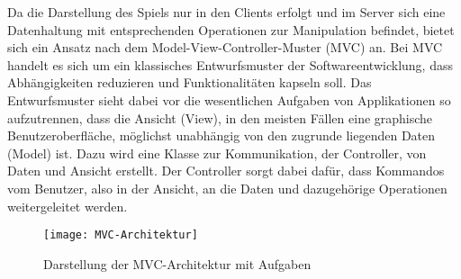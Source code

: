\noindent Da die Darstellung des Spiels nur in den Clients erfolgt und im Server sich eine Datenhaltung mit entsprechenden Operationen zur Manipulation befindet, bietet sich ein Ansatz nach dem Model-View-Controller-Muster (MVC) an. Bei MVC handelt es sich um ein klassisches Entwurfsmuster der Softwareentwicklung, dass Abhängigkeiten reduzieren und Funktionalitäten kapseln soll. Das Entwurfsmuster sieht dabei vor die wesentlichen Aufgaben von Applikationen so aufzutrennen, dass die Ansicht (View), in den meisten Fällen eine graphische Benutzeroberfläche, möglichst unabhängig von den zugrunde liegenden Daten (Model) ist. Dazu wird eine Klasse zur Kommunikation, der Controller, von Daten und Ansicht erstellt. Der Controller sorgt dabei dafür, dass Kommandos vom Benutzer, also in der Ansicht, an die Daten und dazugehörige Operationen weitergeleitet werden.

\begin{figure}[h]
	\centering
	\captionsetup{justification=centering}
	\texttt{[image: MVC-Architektur]}
	\caption[MVC]{Darstellung der MVC-Architektur mit Aufgaben}
	\label{fig:MVC}
\end{figure}

